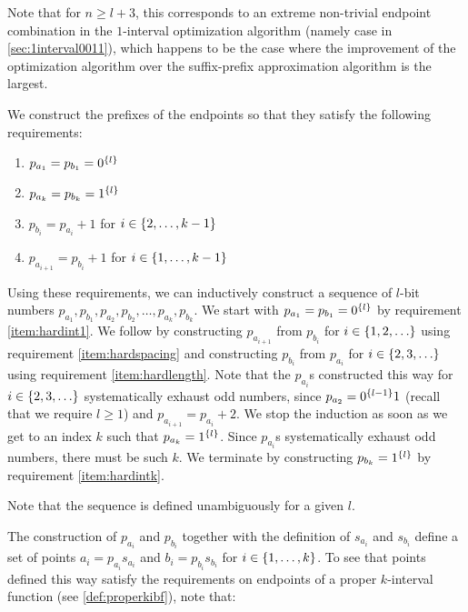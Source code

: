 Note that for $n \geq l + 3$,
this  corresponds to an extreme
non-trivial endpoint combination in the $1$-interval
optimization algorithm
(namely case 
in \autoref{sec:1interval0011}),
which happens to be the case where the improvement
of the optimization algorithm
over the suffix-prefix approximation algorithm
is the largest.

We construct the  prefixes of the endpoints
so that they
satisfy the following requirements:

\begin{enumerate}
\item \label{item:hardint1}
$p_{a_1} = p_{b_1} = 0^{\{l\}}$
\item \label{item:hardintk}
$p_{a_k} = p_{b_k} = 1^{\{l\}}$
\item \label{item:hardlength}
$p_{b_i} = p_{a_i} + 1$
for $i \in \{2, \ldots, k-1\}$
\item \label{item:hardspacing}
$p_{a_{i+1}} = p_{b_i} + 1$
for $i \in \{1, \ldots, k-1\}$
\end{enumerate}

Using these requirements,
we can inductively construct a sequence of $l$-bit numbers
$p_{a_1}, p_{b_1}, p_{a_2}, p_{b_2}, \ldots,
p_{a_k}, p_{b_k}$.
We start with
$p_{a_1} = p_{b_1} = 0^{\{l\}}$
by requirement \ref{item:hardint1}.
We follow by
constructing $p_{a_{i+1}}$ from $p_{b_i}$
for $i \in \{1, 2, \ldots\}$
using requirement \ref{item:hardspacing} and
constructing $p_{b_i}$ from $p_{a_i}$
for $i \in \{2, 3, \ldots\}$
using requirement \ref{item:hardlength}.
Note that the $p_{a_i}$s constructed this way
for $i \in \{2, 3, \ldots\}$
systematically
exhaust odd numbers,
since $p_{a_2} = 0^{\{l-1\}} 1$
(recall that we require $l \geq 1$)
and $p_{a_{i+1}} = p_{a_i} + 2$.
We stop the induction
as soon as we get to an index $k$ such that
$p_{a_k} = 1^{\{l\}}$.
Since $p_{a_i}$s systematically exhaust odd numbers,
there must be such $k$.
We terminate by constructing $p_{b_k} = 1^{\{l\}}$
by requirement \ref{item:hardintk}.

Note that the sequence is defined unambiguously
for a given $l$.

The construction of $p_{a_i}$ and $p_{b_i}$
together with the definition
of $s_{a_i}$ and $s_{b_i}$ define a set of points
$a_i = p_{a_i} s_{a_i}$ and $b_i = p_{b_i} s_{b_i}$
for $i \in \{1, \ldots, k\}$.
To see that points defined this way
satisfy the requirements on endpoints
of a proper $k$-interval function
(see \autoref{def:properkibf}),
note that:

